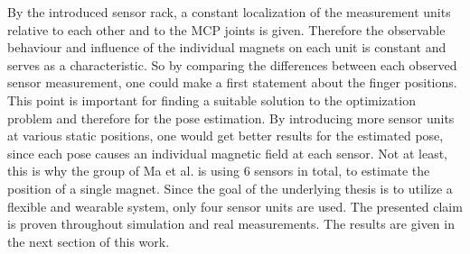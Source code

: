 By the introduced sensor rack, a constant localization of the measurement units relative to each other and to the \ac{MCP} joints is given. Therefore the observable behaviour and influence of the individual magnets on each unit is constant and serves as a characteristic. So by comparing the differences between each observed sensor measurement, one could make a first statement about the finger positions. This point is important for finding a suitable solution to the optimization problem and therefore for the pose estimation. By introducing more sensor units at various static positions, one would get better results for the estimated pose, since each pose causes an individual magnetic field at each sensor. Not at least, this is why the group of Ma et al. is using 6 sensors in total, to estimate the position of a single magnet. Since the goal of the underlying thesis is to utilize a flexible and wearable system, only four sensor units are used. The presented claim is proven throughout simulation and real measurements. The results are given in the next section of this work.




